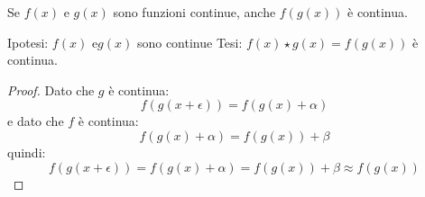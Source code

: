 \begin{teorema}
Se \(f(x)\) e \(g(x)\) sono funzioni continue, anche \(f(g(x))\) è continua.
\end{teorema}

\noindent Ipotesi: 
\(f(x) \text{ e} g(x)\) sono continue
\tab Tesi: 
\(f(x) \star g(x) = f(g(x))\) è continua.

\begin{proof}
Dato che \(g\) è continua: 
\[f(g(x+\epsilon)) = f(g(x)+\alpha)\]
e dato che \(f\) è continua: 
\[f(g(x)+\alpha)=f(g(x))+\beta\]
quindi: 
\[f(g(x+\epsilon)) = f(g(x)+\alpha) = f(g(x))+\beta \approx f(g(x))\]
\end{proof}











